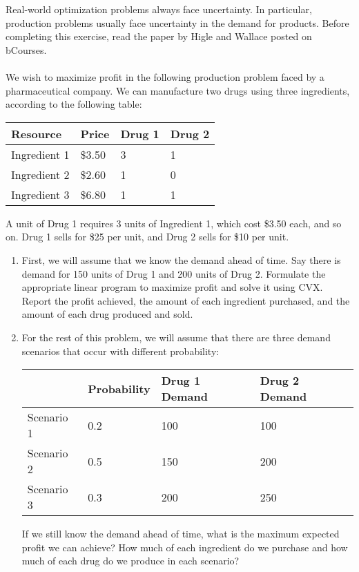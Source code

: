 \begin{exercise}\rm
Real-world optimization problems always face uncertainty. In particular, production problems usually face uncertainty in the demand for products. Before completing this exercise, read the paper by Higle and Wallace posted on bCourses.\\
\\
We wish to maximize profit in the following production problem faced by a pharmaceutical company. We can manufacture two drugs using three ingredients, according to the following table:

\begin{center}
\begin{tabular}{l|l|l|l}
Resource & Price & Drug 1 & Drug 2\\
\hline
Ingredient 1 & \$3.50 & 3 & 1\\
\hline
Ingredient 2 & \$2.60 & 1 & 0\\
\hline
Ingredient 3 & \$6.80 & 1 & 1\\
\hline
\end{tabular}
\end{center}

A unit of Drug 1 requires 3 units of Ingredient 1, which cost \$3.50 each, and so on. Drug 1 sells for \$25 per unit, and Drug 2 sells for \$10 per unit.

\begin{enumerate}
\item First, we will assume that we know the demand ahead of time. Say there is demand for 150 units of Drug 1 and 200 units of Drug 2. Formulate the appropriate linear program to maximize profit and solve it using CVX. Report the profit achieved, the amount of each ingredient purchased, and the amount of each drug produced and sold.

\item For the rest of this problem, we will assume that there are three demand scenarios that occur with different probability:

\begin{center}
\begin{tabular}{l|l|l|l}
& Probability & Drug 1 Demand & Drug 2 Demand\\
\hline
Scenario 1 & 0.2 & 100 & 100\\
\hline
Scenario 2 & 0.5  & 150 & 200\\
\hline
Scenario 3 & 0.3 & 200 & 250\\
\hline
\end{tabular}
\end{center}
If we still know the demand ahead of time, what is the maximum expected profit we can achieve? How much of each ingredient do we purchase and how much of each drug do we produce in each scenario?


\end{enumerate}
\end{exercise}
